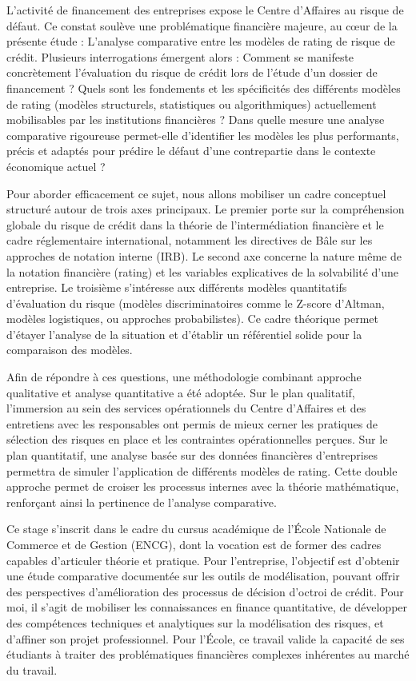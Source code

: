 L'activité de financement des entreprises expose le Centre d'Affaires au risque de défaut. Ce constat soulève une problématique financière majeure, au cœur de la présente étude : L'analyse comparative entre les modèles de rating de risque de crédit. Plusieurs interrogations émergent alors : Comment se manifeste concrètement l'évaluation du risque de crédit lors de l'étude d'un dossier de financement ? Quels sont les fondements et les spécificités des différents modèles de rating (modèles structurels, statistiques ou algorithmiques) actuellement mobilisables par les institutions financières ? Dans quelle mesure une analyse comparative rigoureuse permet-elle d'identifier les modèles les plus performants, précis et adaptés pour prédire le défaut d'une contrepartie dans le contexte économique actuel ?

Pour aborder efficacement ce sujet, nous allons mobiliser un cadre conceptuel structuré autour de trois axes principaux. Le premier porte sur la compréhension globale du risque de crédit dans la théorie de l'intermédiation financière et le cadre réglementaire international, notamment les directives de Bâle sur les approches de notation interne (IRB). Le second axe concerne la nature même de la notation financière (rating) et les variables explicatives de la solvabilité d'une entreprise. Le troisième s’intéresse aux différents modèles quantitatifs d'évaluation du risque (modèles discriminatoires comme le Z-score d'Altman, modèles logistiques, ou approches probabilistes). Ce cadre théorique permet d'étayer l'analyse de la situation et d'établir un référentiel solide pour la comparaison des modèles.

Afin de répondre à ces questions, une méthodologie combinant approche qualitative et analyse quantitative a été adoptée. Sur le plan qualitatif, l'immersion au sein des services opérationnels du Centre d'Affaires et des entretiens avec les responsables ont permis de mieux cerner les pratiques de sélection des risques en place et les contraintes opérationnelles perçues. Sur le plan quantitatif, une analyse basée sur des données financières d'entreprises permettra de simuler l'application de différents modèles de rating. Cette double approche permet de croiser les processus internes avec la théorie mathématique, renforçant ainsi la pertinence de l'analyse comparative.

Ce stage s’inscrit dans le cadre du cursus académique de l’École Nationale de Commerce et de Gestion (ENCG), dont la vocation est de former des cadres capables d’articuler théorie et pratique. Pour l'entreprise, l'objectif est d'obtenir une étude comparative documentée sur les outils de modélisation, pouvant offrir des perspectives d'amélioration des processus de décision d'octroi de crédit. Pour moi, il s'agit de mobiliser les connaissances en finance quantitative, de développer des compétences techniques et analytiques sur la modélisation des risques, et d'affiner son projet professionnel. Pour l'École, ce travail valide la capacité de ses étudiants à traiter des problématiques financières complexes inhérentes au marché du travail.

